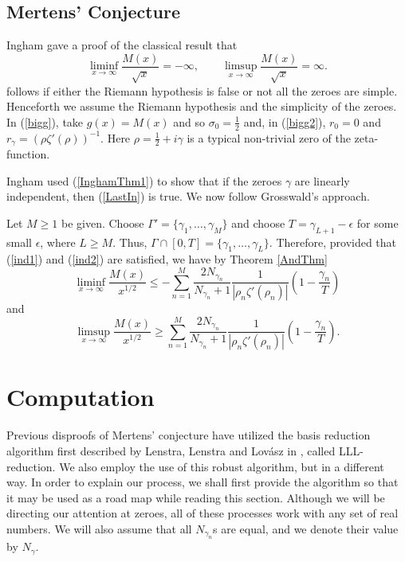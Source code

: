 \documentclass{article}
\numberwithin{equation}{section}
\begin{document}
\subsection{Mertens' Conjecture}
Ingham \cite[pp.\ 318-319]{Ingham1942}  gave a proof of the classical result that
\begin{equation}\label{LastIn}
\liminf_{x\rightarrow \infty} \frac{M(x)}{\sqrt{x}} = -\infty, \quad\quad \limsup_{x\rightarrow \infty} \frac{M(x)}{\sqrt{x}} = \infty.
\end{equation}
follows if either the Riemann hypothesis is false or not all the zeroes are simple.
Henceforth we assume the Riemann hypothesis and the simplicity of the zeroes.
In (\ref{bigg}), take $g(x) = M(x)$ and so $\sigma_{0} = \frac{1}{2}$ and, in (\ref{bigg2}), $r_{0} = 0$ and $r_{\gamma} = (\rho\zeta'(\rho))^{-1}.$ Here $\rho = \frac{1}{2} + i\gamma$ is a typical non-trivial zero of the zeta-function.

Ingham \cite[Thm.\ A]{Ingham1942} used (\ref{InghamThm1}) to show that if the zeroes $\gamma$ are linearly independent, then (\ref{LastIn}) is true. We now follow Grosswald's approach.

 Let $M \geq 1$ be given. Choose $\Gamma' = \{\gamma_{1}, \ldots, \gamma_{M}\}$ and choose $T = \gamma_{L+1}-\epsilon$ for some small $\epsilon$, where $L \geq M$. Thus, $\Gamma\cap [0,T] = \{\gamma_{1}, \ldots, \gamma_{L}\}$. Therefore, provided that (\ref{ind1}) and (\ref{ind2}) are satisfied, we have by Theorem \ref{AndThm}
\begin{equation}\label{AndS3}
\liminf_{x\rightarrow\infty} \frac{M(x)}{x^{1/2}} \leq - \sum_{n=1}^{M} \frac{2N_{\gamma_{n}}}{N_{\gamma_{n}} + 1} \frac{1}{|\rho_{n} \zeta'(\rho_{n})|} \left(1- \frac{\gamma_{n}}{T}\right)
\end{equation}
and
\begin{equation}\label{AndS4}
\limsup_{x\rightarrow\infty} \frac{M(x)}{x^{1/2}} \geq  \sum_{n=1}^{M} \frac{2N_{\gamma_{n}}}{N_{\gamma_{n}} + 1} \frac{1}{|\rho_{n} \zeta'(\rho_{n})|} \left(1- \frac{\gamma_{n}}{T}\right).
\end{equation}



\section{Computation}\label{comp}

Previous disproofs of Mertens' conjecture have utilized the basis reduction algorithm first described by  Lenstra, Lenstra and Lov\'asz in \cite{lll}, called LLL-reduction. We also employ the use of this robust algorithm, but in a different way. In order to explain our process, we shall first provide the algorithm so that it may be used as a road map while reading this section. Although we will be directing our attention at zeroes, all of these processes work with any set of real numbers. We will also assume that all $N_{\gamma_{n}}$s are equal, and we denote their value by $N_{\gamma}$.
\end{document}
